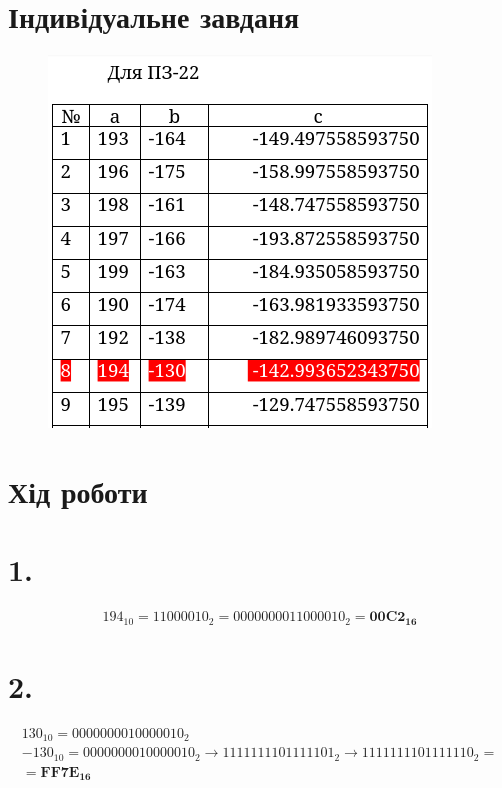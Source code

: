 \documentclass{article}
\begin{document}
\begin{normalsize}
	\section*{Індивідуальне завданя}
	\begin{figure}[H]
		\centering
		\includegraphics[scale=0.8]{v}
	\end{figure}

	\section*{Хід роботи}
	\section*{1.}
	\begin{Large}
		\begin{gather}
			194_{10} = 11000010_2 = 0000000011000010_2 = \boldsymbol{00C2_{16}}\nonumber
		\end{gather}
	\end{Large}

	\section*{2.}
	\begin{Large}
		\begin{gather}
			130_{10} = 0000000010000010_2\nonumber\\
			-130_{10} = 0000000010000010_2 \rightarrow 1111111101111101_2 \rightarrow 1111111101111110_2 =\nonumber\\
			= \boldsymbol{FF7E_{16}}\nonumber
		\end{gather}
	\end{Large}


\end{normalsize}
\end{document}
